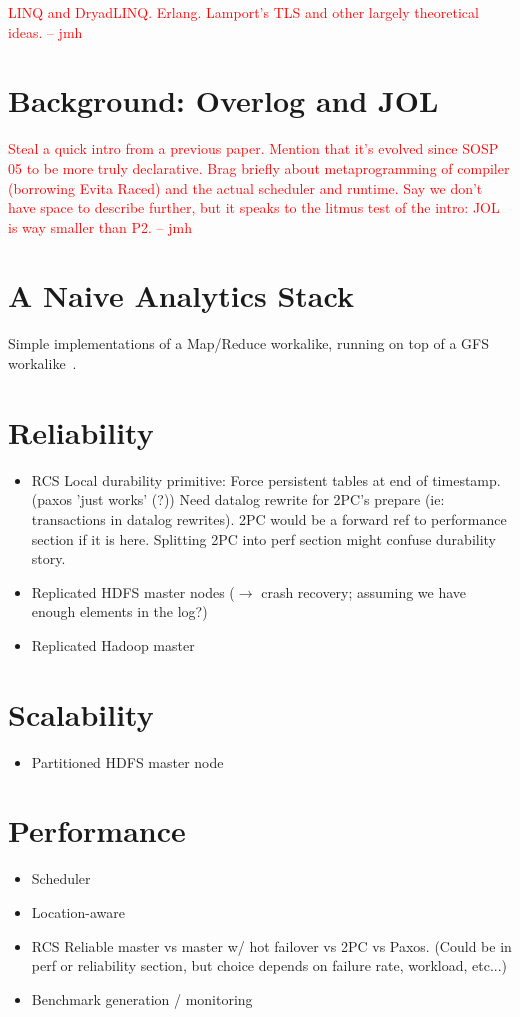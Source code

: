 \documentclass{sig-alternate}
\newcommand{\jmh}[1]{{\textcolor{red}{#1 -- jmh}}}
\begin{document}
\jmh{LINQ and DryadLINQ.  Erlang.  Lamport's TLS and other largely theoretical ideas.}

\section{Background: Overlog and JOL}
\jmh{Steal a quick intro from a previous paper.  Mention that it's evolved since SOSP 05 to be more truly declarative.  Brag briefly about metaprogramming of compiler (borrowing Evita Raced) and the actual scheduler and runtime.  Say we don't have space to describe further, but it speaks to the litmus test of the intro: JOL is way smaller than P2.}
\section{A Naive Analytics Stack}
Simple implementations of a Map/Reduce workalike, running on top of a
GFS workalike~\cite{gfs-sosp}.

\section{Reliability}
\begin{itemize}
\item
  RCS Local durability primitive: Force persistent tables at end of
  timestamp.  (paxos 'just works' (?)) Need datalog rewrite for 2PC's
  prepare (ie: transactions in datalog rewrites).  2PC would be a
  forward ref to performance section if it is here.  Splitting 2PC
  into perf section might confuse durability story.

\item
  Replicated HDFS master nodes ($\to$ crash recovery; assuming we have
  enough elements in the log?)

\item
  Replicated Hadoop master

\end{itemize}

\section{Scalability}
\begin{itemize}
\item
  Partitioned HDFS master node
\end{itemize}

\section{Performance}
\begin{itemize}
\item
  Scheduler
\item
  Location-aware
\item
  RCS Reliable master vs master w/ hot failover vs 2PC vs Paxos.  (Could be in perf or reliability section, but choice depends on failure rate, workload, etc...)
\item
  Benchmark generation / monitoring
\end{itemize}
\end{document}
